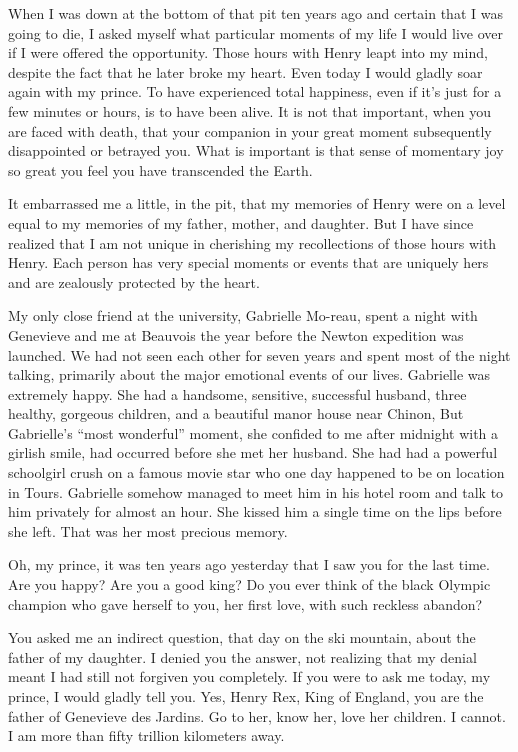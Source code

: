 \documentclass[]{article}
\begin{document}
{When I was down at the bottom of that pit ten years ago and certain that I was going to die, I asked myself what particular moments of my life I would live over if I were offered the opportunity.  Those hours with Henry leapt into my mind, despite the fact that he later broke my heart.  Even today I would gladly soar again with my prince.  To have experienced total happiness, even if it’s just for a few minutes or hours, is to have been alive.  It is not that important, when you are faced with death, that your companion in your great moment subsequently disappointed or betrayed you.  What is important is that sense of momentary joy so great you feel you have transcended the Earth.

It embarrassed me a little, in the pit, that my memories of Henry were on a level equal to my memories of my father, mother, and daughter.  But I have since realized that I am not unique in cherishing my recollections of those hours with Henry.  Each person has very special moments or events that are uniquely hers and are zealously protected by the heart.

My only close friend at the university, Gabrielle Mo-reau, spent a night with Genevieve and me at Beauvois the year before the Newton expedition was launched.  We had not seen each other for seven years and spent most of the night talking, primarily about the major emotional events of our lives.  Gabrielle was extremely happy.  She had a handsome, sensitive, successful husband, three healthy, gorgeous children, and a beautiful manor house near Chinon, But Gabrielle’s “most wonderful” moment, she confided to me after midnight with a girlish smile, had occurred before she met her husband.  She had had a powerful schoolgirl crush on a famous movie star who one day happened to be on location in Tours.  Gabrielle somehow managed to meet him in his hotel room and talk to him privately for almost an hour.  She kissed him a single time on the lips before she left.  That was her most precious memory.

Oh, my prince, it was ten years ago yesterday that I saw you for the last time.  Are you happy? Are you a good king? Do you ever think of the black Olympic champion who gave herself to you, her first love, with such reckless abandon?

You asked me an indirect question, that day on the ski mountain, about the father of my daughter.  I denied you the answer, not realizing that my denial meant I had still not forgiven you completely.  If you were to ask me today, my prince, I would gladly tell you.  Yes, Henry Rex, King of England, you are the father of Genevieve des Jardins.  Go to her, know her, love her children.  I cannot.  I am more than fifty trillion kilometers away.

}
\end{document}
